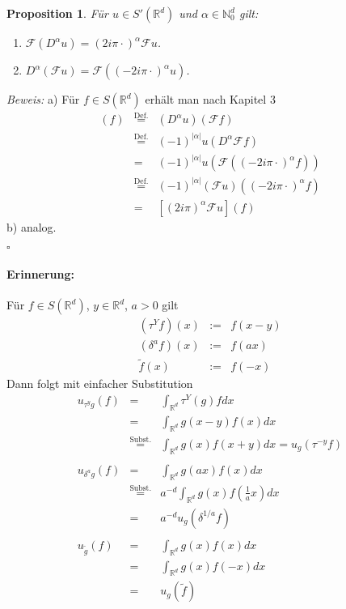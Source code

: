 \documentclass[12pt,a4paper,titlepage]{scrartcl}
\newtheorem{Prop}[Satz]{Proposition}
\numberwithin{equation}{section}
\newcommand{\R}{\mathbb{R}} %
\newcommand{\N}{\mathbb{N}} %
\newcommand{\F}{\mathcal{F}}
\newcommand{\m}{\cdot}
\newcommand{\Bew}{\emph{Beweis: }}
\newcommand{\qed}{\begin{flushright}
		$\square$
	\end{flushright}}
\begin{document}
	\begin{Prop}
		Für $u\in S'(\R^d)$ und $\alpha\in \N_0^d$ gilt:
		\begin{enumerate}
			\item[a)] $\F(D^\alpha u) = (2i\pi \m)^\alpha \F u$.
			\item[b)] $D^\alpha (\F u) = \F((-2i\pi \m)^\alpha u)$.
		\end{enumerate}
	\end{Prop}
	\Bew a) Für $f\in S(\R^d)$ erhält man nach Kapitel 3
	\begin{eqnarray}
		[\F(D^\alpha u)](f)&\overset{\text{Def.}}{=}& (D^\alpha u)(\F f)\nonumber\\
		&\overset{\text{Def.}}{=} & (-1)^{|\alpha|} u(D^\alpha \F f)\nonumber\\
		&=& (-1)^{|\alpha|} u (\F((-2i\pi\m)^\alpha f)) \nonumber\\
		&\overset{\text{Def.}}{=}& (-1)^{|\alpha|}(\F u)((-2i\pi\m)^\alpha f)\nonumber\\
		&=& [(2i\pi)^\alpha \F u](f)\nonumber
	\end{eqnarray}
	b) analog.
	\qed
	
	\paragraph{Erinnerung:} Für $f\in S(\R^d)$, $y\in \R^d$, $a>0$ gilt
	\begin{eqnarray}
		(\tau^Y f)(x) &:=& f(x-y)\nonumber\\
		(\delta^a f)(x)&:=& f(ax)\nonumber\\
		\tilde{f}(x) &:= & f(-x)\nonumber
	\end{eqnarray}
	Dann folgt mit einfacher Substitution
	\begin{eqnarray}
		u_{\tau^y g}(f) &=& \int_{\R^d} \tau^Y(g)f dx \nonumber\\
		&=& \int_{\R^d}g(x-y) f(x) dx \nonumber\\
		&\overset{\text{Subst.}}{=}& \int_{\R^d} g(x)f(x+y)dx = u_g(\tau^{-y}f)\nonumber\\\nonumber \\
		u_{\delta^a g}(f) &=& \int_{\R^d}g(ax)f(x)dx \nonumber\\
		&\overset{\text{Subst.}}{=}& a^{-d}\int_{\R^d} g(x)f(\frac{1}{a}x)dx \nonumber\\
		&=& a^{-d}u_g(\delta^{1/a}f)\nonumber\\\nonumber\\
		u_{\tilde{g}}(f) &=& \int_{\R^d}g(x)f(x)dx \nonumber\\
		&=& \int_{\R^d}g(x)f(-x) dx\nonumber\\
		&=& u_g(\tilde{f})\nonumber
	\end{eqnarray}
	
\end{document}
